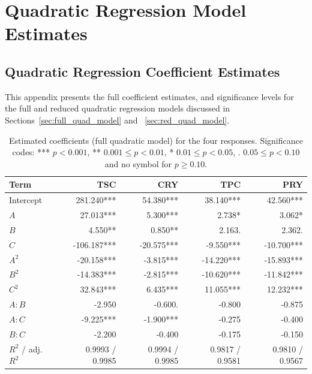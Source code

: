 \documentclass[MScDSA]{uccthesis}
\begin{document}
\chapter{Quadratic Regression Model Estimates}
\label{app:quad_regression_model}
\section{Quadratic Regression Coefficient Estimates}
This appendix presents the full coefficient estimates, and significance levels for the full and reduced quadratic regression models discussed in Sections~\ref{sec:full_quad_model} and ~\ref{sec:red_quad_model}.

\begin{table}[H]
\centering
\caption{Estimated coefficients (full quadratic model) for the four responses. Significance codes: *** $p<0.001$, ** $0.001\leq p<0.01$, * $0.01\leq p<0.05$, . $0.05\leq p<0.10$ and no symbol for $p \geq 0.10$.}
    \label{tab:full_quadratic_coefficients}
    \begin{tabular}{lrrrr}
    \toprule
    \textbf{Term} & \textbf{TSC} & \textbf{CRY} & \textbf{TPC} & \textbf{PRY} \\
    \midrule
    Intercept & 281.240*** & 54.380*** & 38.140*** & 42.560*** \\
    $A$       & 27.013***  & 5.300***  & 2.738*    & 3.062*    \\
    $B$       & 4.550**    & 0.850**   & 2.163.     & 2.362.    \\
    $C$       & -106.187*** & -20.575*** & -9.550*** & -10.700*** \\
    $A^2$     & -20.158*** & -3.815*** & -14.220*** & -15.893*** \\
    $B^2$     & -14.383*** & -2.815*** & -10.620*** & -11.842*** \\
    $C^2$     & 32.843***  & 6.435***  & 11.055***  & 12.232*** \\
    $A:B$     & -2.950     & -0.600.   & -0.800      & -0.875      \\
    $A:C$     & -9.225***  & -1.900*** & -0.275      & -0.400      \\
    $B:C$     & -2.200     & -0.400    & -0.175      & -0.150      \\
    $R^2$ / adj. $R^2$ & 0.9993 / 0.9985 & 0.9994 / 0.9985 & 0.9817 / 0.9581 & 0.9810 / 0.9567 \\
    \bottomrule
    \end{tabular}
\end{table}  
\end{document}

